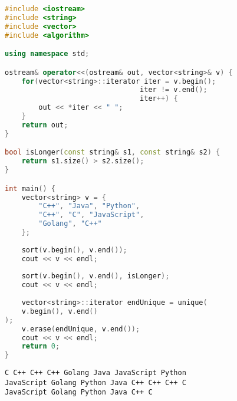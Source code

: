 \vspace{0.5cm}


\begin{lstlisting}[language=C++]
#include <iostream>
#include <string>
#include <vector>
#include <algorithm>

using namespace std;

ostream& operator<<(ostream& out, vector<string>& v) {
	for(vector<string>::iterator iter = v.begin();
								iter != v.end();
								iter++) {
		out << *iter << " ";
	}
	return out;
}

bool isLonger(const string& s1, const string& s2) {
	return s1.size() > s2.size();
}

int main() {
	vector<string> v = {
		"C++", "Java", "Python",
		"C++", "C", "JavaScript", 
		"Golang", "C++"
	};
	
	sort(v.begin(), v.end());
	cout << v << endl;
	
	sort(v.begin(), v.end(), isLonger);
	cout << v << endl;
	
	vector<string>::iterator endUnique = unique(
	v.begin(), v.end()
);
	v.erase(endUnique, v.end());
	cout << v << endl;
	return 0;
}
\end{lstlisting}

\begin{tcolorbox}
	\begin{verbatim}
C C++ C++ C++ Golang Java JavaScript Python 
JavaScript Golang Python Java C++ C++ C++ C
JavaScript Golang Python Java C++ C
	\end{verbatim}
\end{tcolorbox}